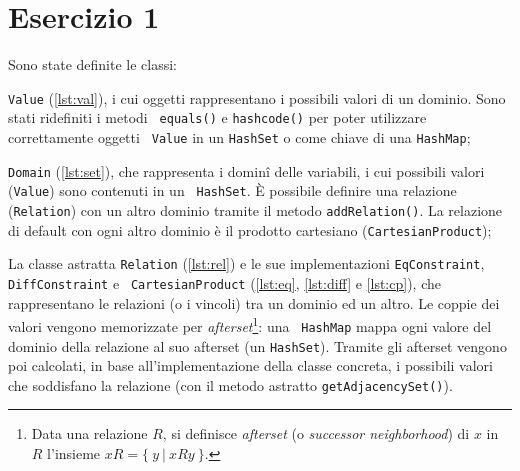 \section{Esercizio 1}

Sono state definite le classi: %
%
\begin{enumerate*}

    \item \texttt{Value} (\autoref{lst:val}), i cui oggetti rappresentano i
    possibili valori di un dominio. Sono stati ridefiniti i metodi {\tt
    equals()} e {\tt hashcode()} per poter utilizzare correttamente oggetti {\tt
    Value} in un {\tt HashSet} o come chiave di una {\tt HashMap};

    \item \texttt{Domain} (\autoref{lst:set}), che rappresenta i dominî delle
    variabili, i cui possibili valori ({\tt Value}) sono contenuti in un {\tt
    HashSet}. È possibile definire una relazione ({\tt Relation}) con un altro
    dominio tramite il metodo {\tt addRelation()}. La relazione di default con
    ogni altro dominio è il prodotto cartesiano ({\tt CartesianProduct});

    \item La classe astratta {\tt Relation} (\autoref{lst:rel}) e le sue
    implementazioni {\tt EqConstraint}, {\tt DiffConstraint} e {\tt
    CartesianProduct} (\autoref{lst:eq}, \ref{lst:diff} e \ref{lst:cp}), che
    rappresentano le relazioni (o i vincoli) tra un dominio ed un altro. Le
    coppie dei valori vengono memorizzate per \emph{afterset}\footnote{Data una
    relazione $R$, si definisce \emph{afterset} (o \emph{successor
    neighborhood}) di $x$ in $R$ l'insieme $xR = \{\ y\ |\ xRy\ \}$.}: una {\tt
    HashMap} mappa ogni valore del dominio della relazione al suo afterset (un
    {\tt HashSet}). Tramite gli afterset vengono poi calcolati, in base
    all'implementazione della classe concreta, i possibili valori che soddisfano
    la relazione (con il metodo astratto {\tt getAdjacencySet()}).

\end{enumerate*}








